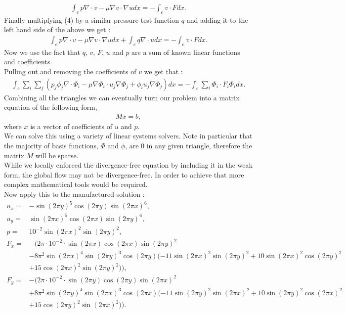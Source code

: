 \documentclass[11pt,twoside,a4paper]{article}
\begin{document}
\begin{align*}
\int_{e} p \nabla \cdot v - \mu \nabla v \cdot \nabla u dx = -\int_{e} v \cdot F dx .
\end{align*}
Finally multiplying (4) by a similar pressure test function $q$ and adding it to the left hand side of the above we get :
\begin{align}
\int_{e} p \nabla \cdot v - \mu \nabla v \cdot \nabla u dx + \int_{e} q \nabla \cdot u dx = -\int_{e} v \cdot F dx .
\end{align}
Now we use the fact that $q$, $v$, $F$, $u$ and $p$ are a sum of known linear functions and coefficients.\\
Pulling out and removing the coefficients of $v$ we get that :
\begin{align*}
 \int_{e} \sum_i \sum_j (  p_j \phi_j \nabla  \cdot \Phi_i - \mu \nabla \Phi_i \cdot u_j \nabla \Phi_j +   \phi_i u_j \nabla \Phi_j) dx = -\int_{e} \sum_i \Phi_i \cdot F_i \Phi_i dx .
\end{align*}
Combining all the triangles we can eventually turn our problem into a matrix equation of the following form,
\begin{align}
M x = b ,
\end{align}
where $x$ is a vector of coefficients of $u$ and $p$.\\
We can solve this using a variety of linear systems solvers. Note in particular that the majority of basis functions, $\Phi$ and $\phi$, are $0$ in any given triangle, therefore the matrix $M$ will be sparse.\\
While we locally enforced the divergence-free equation by including it in the weak form, the global flow may not be divergence-free. In order to achieve that more complex mathematical tools would be required.\\
Now apply this to the manufactured solution :
\begin{align*}
u_x =  &-\sin(2 \pi y)^5 \cos(2 \pi y)  \sin(2 \pi x)^6, \\
u_y = &\sin(2 \pi x)^5 \cos(2 \pi x)  \sin(2 \pi y)^6, \\
p = &10^{-2} \sin(2 \pi x)^2 \sin(2 \pi y)^2, \\
F_x =& -(2 \pi \cdot 10^{-2} \cdot \sin( 2 \pi x) \cos(2 \pi x) \sin(2 \pi y)^2 \\
	&- 8 \pi^2 \sin(2 \pi x)^4 \sin(2 \pi y)^3 \cos(2 \pi y)(-11 \sin(2 \pi x)^2 \sin(2 \pi y)^2 + 10 \sin(2 \pi x)^2 \cos(2 \pi y)^2 \\
	& + 15 \cos(2 \pi x)^2 \sin(2 \pi y)^2 )),\\
F_y = &-(2 \pi \cdot 10^{-2} \cdot \sin( 2 \pi y) \cos(2 \pi y) \sin(2 \pi x)^2 \\
	&+ 8 \pi^2 \sin(2 \pi y)^4 \sin(2 \pi x)^3 \cos(2 \pi x)(-11 \sin(2 \pi y)^2 \sin(2 \pi x)^2 + 10 \sin(2 \pi y)^2 \cos(2 \pi x)^2 \\
	&+ 15 \cos(2 \pi y)^2 \sin(2 \pi x)^2 )).
\end{align*}
\end{document}
